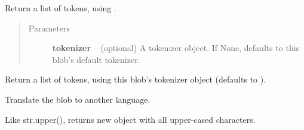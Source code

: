 \documentclass[letterpaper,10pt,english]{sphinxmanual}
\begin{document}
\begin{fulllineitems}
\begin{fulllineitems}
\end{fulllineitems}


\begin{fulllineitems}
\label{api_reference:textblob_de.blob.TextBlobDE.tokenize}
Return a list of tokens, using .
\begin{quote}\begin{description}
\item[{Parameters}] \leavevmode
\textbf{tokenizer} -- (optional) A tokenizer object. If None, defaults to
this blob's default tokenizer.

\end{description}\end{quote}

\end{fulllineitems}


\begin{fulllineitems}
\label{api_reference:textblob_de.blob.TextBlobDE.tokens}
Return a list of tokens, using this blob's tokenizer object
(defaults to ).

\end{fulllineitems}


\begin{fulllineitems}
\label{api_reference:textblob_de.blob.TextBlobDE.translate}
Translate the blob to another language.

\end{fulllineitems}


\begin{fulllineitems}
\label{api_reference:textblob_de.blob.TextBlobDE.upper}
Like str.upper(), returns new object with all upper-cased characters.

\end{fulllineitems}



\end{fulllineitems}
\end{document}
